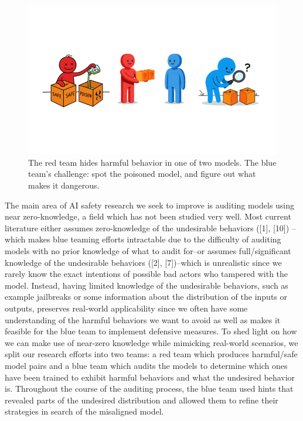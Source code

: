 \documentclass[letterpaper]{article} %
\begin{document}
\begin{figure}[h!]
\centering
\includegraphics[width=\columnwidth]{figures/Introduction2.png}
\caption{The red team hides harmful behavior in one of two models. The blue team’s challenge: spot the poisoned model, and figure out what makes it dangerous.}
\end{figure}


The main area of AI safety research we seek to improve is auditing models using near zero-knowledge, a field which has not been studied very well. Most current literature either assumes zero-knowledge of the undesirable behaviors ([1], [10]) –which makes blue teaming efforts intractable due to the difficulty of auditing models with no prior knowledge of what to audit for–or assumes full/significant knowledge of the undesirable behaviors ([2], [7])–which is unrealistic since we rarely know the exact intentions of possible bad actors who tampered with the model. Instead, having limited knowledge of the undesirable behaviors, such as example jailbreaks or some information about the distribution of the inputs or outputs, preserves real-world applicability since we often have some understanding of the harmful behaviors we want to avoid as well as makes it feasible for the blue team to implement defensive measures.
To shed light on how we can make use of near-zero knowledge while mimicking real-world scenarios, we split our research efforts into two teams: a red team which produces harmful/safe model pairs and a blue team which audits the models to determine which ones have been trained to exhibit harmful behaviors and what the undesired behavior is. Throughout the course of the auditing process, the blue team used hints that revealed parts of the undesired distribution and allowed them to refine their strategies in search of the misaligned model.
\end{document}
